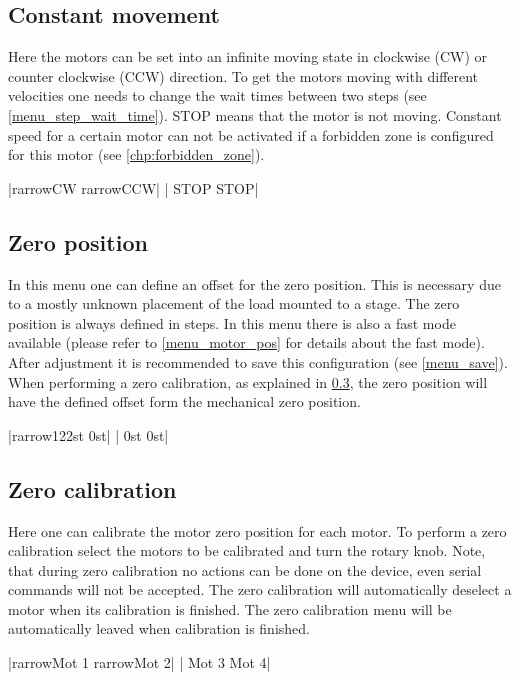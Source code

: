 \subsection{Constant movement}
Here the motors can be set into an infinite moving state in clockwise (CW) or counter clockwise (CCW) direction. To get the motors moving with different velocities one needs to change the wait times between two steps (see \ref{menu_step_wait_time}).
STOP means that the motor is not moving. Constant speed for a certain motor can not be activated if a forbidden zone is configured for this motor (see \ref{chp:forbidden_zone}).
\begin{center}
  |{rarrow}CW     {rarrow}CCW|
             | STOP    STOP|
\end{center}

\subsection{Zero position}
In this menu one can define an offset for the zero position. This is necessary due to a mostly unknown placement of the load mounted to a stage. 
The zero position is always defined in steps. In this menu there is also a fast mode available (please refer to  \ref{menu_motor_pos} for details about the fast mode). After adjustment it is recommended to save this configuration (see \ref{menu_save}). When performing a zero calibration, as explained in \ref{menu_zero_cal}, the zero position will have the defined offset form the mechanical zero position.
\begin{center}
  |{rarrow}122st   0st|
             | 0st     0st|
\end{center}

\subsection{Zero calibration}
\label{menu_zero_cal}
Here one can calibrate the motor zero position for each motor. To perform a zero calibration select the motors to be calibrated and turn the rotary knob. Note, that during zero calibration no actions can be done on the device, even serial commands will not be accepted. The zero calibration will automatically deselect a motor when its calibration is finished. The zero calibration menu will be automatically leaved when calibration is finished.
\begin{center}
  |{rarrow}Mot 1  {rarrow}Mot 2|
             | Mot 3   Mot 4|
\end{center}

